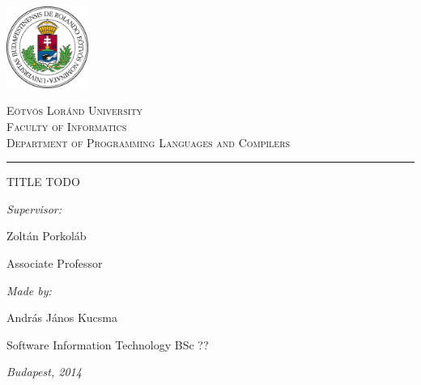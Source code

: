 \begin{titlepage}

\noindent
\parbox[m]{0.2\textwidth}{
    \includegraphics[width=0.2\textwidth]{elte_logo_colored.eps} %
}
\hfill
\parbox[m]{0.7\textwidth}{
    \begin{center}
    \begin{large}
    \textsc{
        Eötvös Loránd University\\
        \vspace{0.5pc}
        Faculty of Informatics\\
        \vspace{0.5pc}
        Department of Programming Languages and Compilers\\
    }
    \end{large}
    \end{center}
}

\vspace{1pc}
\hrule

\vfill

\begin{center}
    {\LARGE TITLE TODO}
\end{center}

\vfill

\noindent
\hspace*{0.05\textwidth}
\parbox{0.45\textwidth}{
    {\it Supervisor:}
    \bigskip

    {\Large Zoltán Porkoláb}
    \smallskip

    Associate Professor
}
\hfill
\parbox{0.45\textwidth}{
    {\it Made by:}
    \bigskip

    {\Large András János Kucsma}
    \smallskip

    Software Information Technology BSc ??
}


\vfill

\begin{center}
    {\large {\it Budapest, 2014}}
\end{center}

\end{titlepage}
